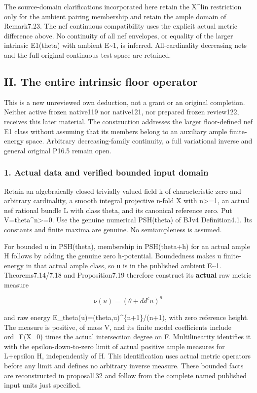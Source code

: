 \documentclass[
]{article}
\begin{document}
The source-domain clarifications incorporated here retain the X\^{}lin
restriction only for the ambient pairing membership and retain the ample
domain of Remark7.23. The nef continuous compatibility uses the explicit
actual metric difference above. No continuity of all nef envelopes, or
equality of the larger intrinsic E1(theta) with ambient
E\textasciitilde1, is inferred. All-cardinality decreasing nets and the
full original continuous test space are retained.

\subsection{II. The entire intrinsic floor
operator}\label{ii.-the-entire-intrinsic-floor-operator}

This is a new unreviewed own deduction, not a grant or an original
completion. Neither active frozen native119 nor native121, nor prepared
frozen review122, receives this later material. The construction
addresses the larger floor-defined nef E1 class without assuming that
its members belong to an auxiliary ample finite-energy space. Arbitrary
decreasing-family continuity, a full variational inverse and general
original P16.5 remain open.

\subsubsection{1. Actual data and verified bounded input
domain}\label{actual-data-and-verified-bounded-input-domain}

Retain an algebraically closed trivially valued field k of
characteristic zero and arbitrary cardinality, a smooth integral
projective n-fold X with n\textgreater=1, an actual nef rational bundle
L with class theta, and its canonical reference zero. Put
V=theta\^{}n\textgreater=0. Use the genuine numerical PSH(theta) of BJv4
Definition4.1. Its constants and finite maxima are genuine. No
semiampleness is assumed.

For bounded u in PSH(theta), membership in PSH(theta+h) for an actual
ample H follows by adding the genuine zero h-potential. Boundedness
makes u finite-energy in that actual ample class, so u is in the
published ambient E\textasciitilde1. Theorems7.14/7.18 and
Proposition7.19 therefore construct its \textbf{actual} raw metric
measure

\[\nu(u)=(\theta+dd^cu)^n\]

and raw energy E\_theta(u)=(theta,u)\^{}\{n+1\}/(n+1), with zero
reference height. The measure is positive, of mass V, and its finite
model coefficients include ord\_F(X\_0) times the actual intersection
degree on F. Multilinearity identifies it with the epsilon-down-to-zero
limit of actual positive ample measures for L+epsilon H, independently
of H. This identification uses actual metric operators before any limit
and defines no arbitrary inverse measure. These bounded facts are
reconstructed in proposal132 and follow from the complete named
published input units just specified.
\end{document}

